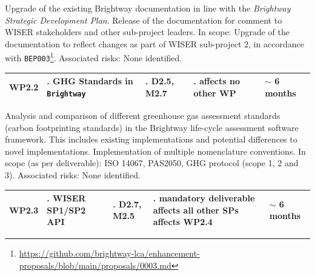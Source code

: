 \documentclass{article}
\begin{document}
    Upgrade of the existing Brightway documentation in line with the \textit{Brightway Strategic Development Plan}. Release of the documentation for comment to WISER stakeholders and other sub-project leaders. In scope: Upgrade of the documentation to reflect changes as part of WISER sub-project 2, in accordance with \texttt{BEP003}\footnote{\url{https://github.com/brightway-lca/enhancement-proposals/blob/main/proposals/0003.md}}. Associated risks: None identified.
    
    \begin{table}[H]
        \centering
        \begin{tabularx}{\linewidth}{
            |>{\hsize=0.25\hsize}X
            |>{\hsize=1.\hsize}X
            |>{\hsize=1.\hsize}X
            |>{\hsize=1.\hsize}X
            |>{\hsize=0.75\hsize}X|
          } %
            \hline
                WP2.2
            &
                GHG Standards in \texttt{Brightway}
            &
                D2.5, M2.7
            &
                affects no other WP
            &
                $\sim$ 6 months
            \\
            \hline
        \end{tabularx}
    \end{table}
    \vspace*{-9pt}
    
    Analysis and comparison of different greenhouse gas assessment standards (carbon footprinting standards) in the Brightway life-cycle assessment software framework. This includes existing implementations and potential differences to novel implementations. Implementation of multiple nomenclature conventions. In scope (as per deliverable): ISO 14067, PAS2050, GHG protocol (scope 1, 2 and 3). Associated risks: None identified.
    
    \begin{table}[H]
        \centering
        \begin{tabularx}{\linewidth}{
            |>{\hsize=0.25\hsize}X
            |>{\hsize=1.\hsize}X
            |>{\hsize=1.\hsize}X
            |>{\hsize=1.\hsize}X
            |>{\hsize=0.75\hsize}X|
          } %
            \hline
                WP2.3
            &
                WISER SP1/SP2 API
            &
                D2.7, M2.5
            &
                mandatory deliverable \newline affects all other SPs \newline affects WP2.4
            &
                $\sim$ 6 months
            \\
            \hline
        \end{tabularx}
    \end{table}
    \vspace*{-9pt}
    
\end{document}

